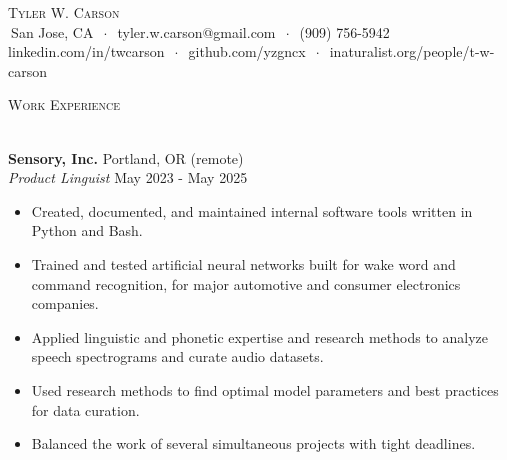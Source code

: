 \documentclass[]{article}
\newcommand{\lineunder} {
	\vspace*{-8pt} \\
	\hspace*{-18pt} \hrulefill \\
}
\newcommand{\header} [1] {
	{\hspace*{-18pt}\vspace*{6pt} \textsc{#1}}
	\vspace*{-6pt} \lineunder
}
\begin{document}
	\vspace*{-40pt}
	
	
	\vspace*{-10pt}
	\begin{center}
		{\Huge \scshape {Tyler W. Carson}}\\
		$\ $San Jose, CA $\ \cdot\ $ tyler.w.carson@gmail.com $\ \cdot\ $ (909) 756-5942\\ linkedin.com/in/twcarson $\ \cdot\ $ github.com/yzgncx $\ \cdot\ $ inaturalist.org/people/t-w-carson\\
	\end{center}
	
	
	\header{Work Experience}
	\vspace{1mm}
	
	\textbf{Sensory, Inc.} \hfill Portland, OR (remote)\\
	\textit{Product Linguist} \hfill May 2023 - May 2025\\
	\vspace{-3mm}
	\begin{itemize} \itemsep 0pt
		\item Created, documented, and maintained internal software tools written in Python and Bash.
		\item Trained and tested artificial neural networks built for wake word and command recognition, for major automotive and consumer electronics companies.
		\item Applied linguistic and phonetic expertise and research methods to analyze speech spectrograms and curate audio datasets.
		\item Used research methods to find optimal model parameters and best practices for data curation.
		\item Balanced the work of several simultaneous projects with tight deadlines.
	\end{itemize}
	
\end{document}
